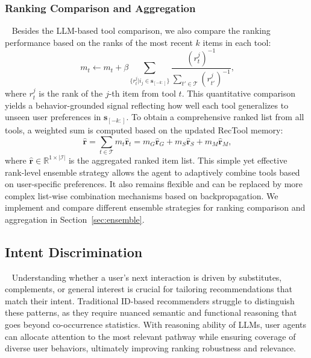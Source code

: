 \subsubsection{Ranking Comparison and Aggregation}~\label{sec:rank_compare}
Besides the LLM-based tool comparison, we also compare the ranking performance based on the ranks of the most recent $k$ items in each tool:
\begin{equation}~\label{eq_agentdr:rankcmpr}
    m_{t} \leftarrow  m_{t} + \beta\sum_{\{r^j_{t}|i_j\in\mathbf{s}_{[-k:]}\}}\frac{(r^j_{t})^{-1}}{\sum_{t'\in\mathcal{T}}(r^j_{t'})^{-1}},
\end{equation}
where $r^j_{t}$ is the rank of the $j$-th item from tool $t$.
This quantitative comparison yields a behavior-grounded signal reflecting how well each tool generalizes to unseen user preferences in $\mathbf{s}_{[-k:]}$. 
To obtain a comprehensive ranked list from all tools, a weighted sum is computed based on the updated RecTool memory:
\begin{equation}~\label{eq_agentdr:aggrank}
    \hat{\mathbf{r}} = \sum_{t\in\mathcal{T}}m_t\hat{\mathbf{r}}_t = m_G\hat{\mathbf{r}}_{G} +m_S\hat{\mathbf{r}}_{S} + m_M\hat{\mathbf{r}}_{M},
\end{equation}
where $\hat{\mathbf{r}}\in\mathbb{R}^{1\times|\mathcal{I}|}$ is the aggregated ranked item list. This simple yet effective rank-level ensemble strategy allows the agent to adaptively combine tools based on user-specific preferences. It also remains flexible and can be replaced by more complex list-wise combination mechanisms based on backpropagation. We implement and compare different ensemble strategies for ranking comparison and aggregation in Section~\ref{sec:ensemble}.

\subsection{Intent Discrimination}~\label{sec:intent_compare}
Understanding whether a user’s next interaction is driven by substitutes, complements, or general interest is crucial for tailoring recommendations that match their intent. Traditional ID-based recommenders struggle to distinguish these patterns, as they require nuanced semantic and functional reasoning that goes beyond co-occurrence statistics. With reasoning ability of LLMs, user agents can allocate attention to the most relevant pathway while ensuring coverage of diverse user behaviors, ultimately improving ranking robustness and relevance.
